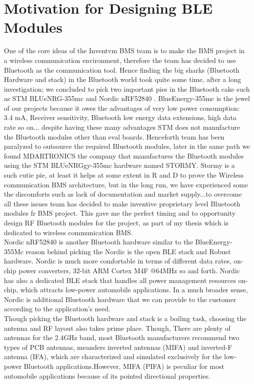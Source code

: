 \section{Motivation for Designing BLE Modules }
One of the core ideas of the Inventvm BMS team is to make the BMS project in a wireless communication environment, therefore the team has decided to use Bluetooth as the communication tool. Hence finding the big sharks (Bluetooth Hardware and stack) in the Bluetooth world took quite some time, after a long investigation; we concluded to pick two important pies in the Bluetooth cake such as STM BLUeNRG-355mc \cite{BLNRG355_STEVAL_GUIDE} and Nordic nRF52840 \cite{NORDIC_nrf52840_USERGUIDE}. BlueEnergy-355mc is the jewel of our projects because it owes the advantages of very low power consumption: 3.4 mA, Receiver sensitivity, Bluetooth low energy data extensions, high data rate so on... despite having these many advantages STM does not manufacture the Bluetooth modules other than eval boards. Henceforth team has been paralyzed to outsource the required Bluetooth modules, later in the same path we found MDARTRONICS the company that manufactures the Bluetooth modules using the STM BLUeNRGgy-355mc hardware named STORMY. Stormy is a such cutie pie, at least it helps at some extent in R and D to prove the Wireless communication BMS architecture, but in the long run, we have experienced some the discomforts such as lack of documentation and market supply...to overcome all these issues team has decided to make inventive proprietary level Bluetooth modules fr BMS project. This gave me the perfect timing and to opportunity design RF Bluetooth modules for the project, as part of my thesis which is dedicated to wireless communication BMS.\\
\indent Nordic nRF52840\cite{NORDIC_nrf52840_USERGUIDE} is another Bluetooth hardware similar to the BlueEnergy-355Mc reason behind picking the Nordic is the open BLE stack and Robust hardware. Nordic is much more comfortable in terms of different data rates, on-chip power converters, 32-bit ARM Cortex M4F @64MHz so and forth. Nordic has also a dedicated BLE stack \cite{NORDIC_nrf52840_SOFTWARESTACK_GUIDE} that handles all power management resources on-chip, which attracts low-power automobile applications. In a much broader sense, Nordic is additional Bluetooth hardware that we can provide to the customer according to the application's need.\\
\indent Though picking the Bluetooth hardware and stack is a boiling task, choosing the antenna and RF layout also takes prime place. Though, There are plenty of antennas for the 2.4GHz band, most Bluetooth manufacturers recommend two types of PCB antennas, meanders inverted antennas (MIFA) and inverted-F antenna (IFA), which are characterized and simulated exclusively for the low-power Bluetooth applications.However, MIFA (PIFA) is peculiar for most automobile applications because of its pointed directional properties.\\

